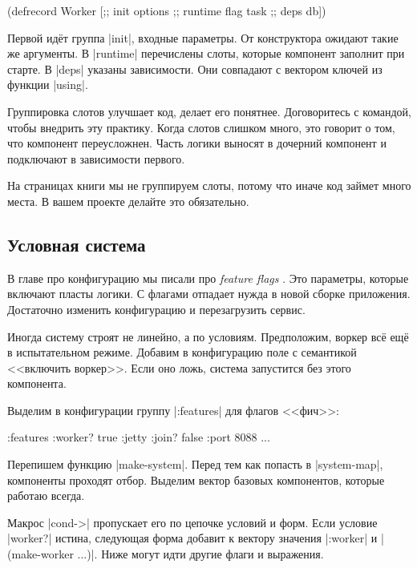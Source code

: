 \begin{english}
  \begin{clojure}
(defrecord Worker
    [;; init
     options
     ;; runtime
     flag
     task
     ;; deps
     db])
  \end{clojure}
\end{english}

Первой ид\"{е}т группа \spverb|init|, входные параметры. От конструктора ожидают
такие же аргументы. В \spverb|runtime| перечислены слоты, которые компонент
заполнит при старте. В \spverb|deps| указаны зависимости. Они совпадают с
вектором ключей из функции \spverb|using|.

Группировка слотов улучшает код, делает его понятнее. Договоритесь с командой,
чтобы внедрить эту практику. Когда слотов слишком много, это говорит о том, что
компонент переусложнен. Часть логики выносят в дочерний компонент и подключают в
зависимости первого.

На страницах книги мы не группируем слоты, потому что иначе код займет много
места. В вашем проекте делайте это обязательно.

\subsection{Условная система}

В главе про конфигурацию мы писали про \emph{feature flags} .
Это параметры, которые включают пласты логики. С флагами отпадает нужда в новой сборке
приложения. Достаточно изменить конфигурацию и перезагрузить сервис.

Иногда систему строят не линейно, а по условиям. Предположим, воркер
вс\"{е} ещ\"{е} в испытательном режиме. Добавим в конфигурацию поле с семантикой
<<включить воркер>>. Если оно ложь, система запустится без этого компонента.

Выделим в конфигурации группу \spverb|:features| для флагов <<фич>>:

\begin{english}
  \begin{clojure}
{:features {:worker? true}
 :jetty {:join? false :port 8088}
 ...}
  \end{clojure}
\end{english}

Перепишем функцию \spverb|make-system|. Перед тем как попасть в
\spverb|system-map|, компоненты проходят отбор. Выделим вектор базовых
компонентов, которые работаю всегда.

Макрос \spverb|cond->| пропускает его по цепочке условий и форм. Если условие
\spverb|worker?| истина, следующая форма добавит к вектору значения
\spverb|:worker| и \spverb|(make-worker {...})|. Ниже могут идти другие флаги и
выражения.

